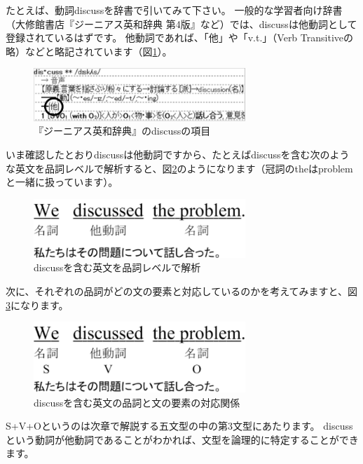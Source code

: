 \documentclass[12pt,titlepage]{jsarticle}
\begin{document}
  たとえば、動詞discussを辞書で引いてみて下さい。
  一般的な学習者向け辞書（大修館書店『ジーニアス英和辞典 第4版』など）では、discussは他動詞として登録されているはずです。
  他動詞であれば、「他」や「v.t.」（Verb Transitiveの略）などと略記されています（図\ref{fig8}）。
  \begin{figure}[htbp]
   \begin{center}
    \includegraphics[width=8cm]{./figure/fig8.pdf}
    \caption{『ジーニアス英和辞典』のdiscussの項目}
    \label{fig8}
   \end{center}
  \end{figure}

いま確認したとおりdiscussは他動詞ですから、たとえばdiscussを含む次のような英文を品詞レベルで解析すると、図\ref{fig9}のようになります（冠詞のtheはproblemと一緒に扱っています）。
  \begin{figure}[htbp]
   \begin{center}
    \includegraphics[width=8cm]{./figure/fig9.pdf}
    \caption{discussを含む英文を品詞レベルで解析}
    \label{fig9}
   \end{center}
  \end{figure}

  次に、それぞれの品詞がどの文の要素と対応しているのかを考えてみますと、図\ref{fig10}になります。
  \begin{figure}[htbp]
   \begin{center}
    \includegraphics[width=8cm]{./figure/fig10.pdf}
    \caption{discussを含む英文の品詞と文の要素の対応関係}
    \label{fig10}
   \end{center}
  \end{figure}

  S+V+Oというのは次章で解説する五文型の中の第3文型にあたります。
  discussという動詞が他動詞であることがわかれば、文型を論理的に特定することができます。
\end{document}
